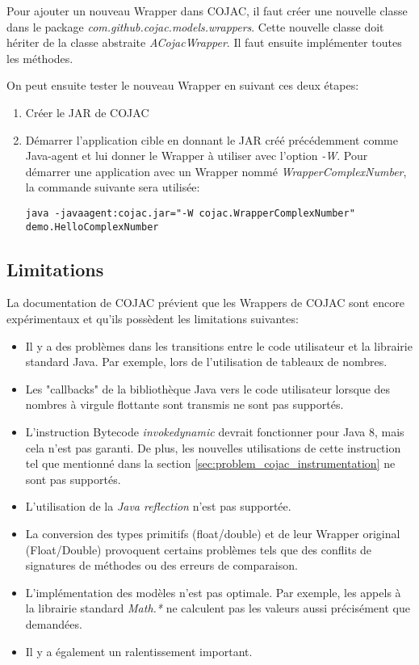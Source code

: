 Pour ajouter un nouveau \gls{Wrapper} dans \gls{COJAC}, il faut créer une nouvelle classe dans le package \textit{com.github.cojac.models.wrappers}. Cette nouvelle classe doit hériter de la classe abstraite \textit{ACojacWrapper}. Il faut ensuite implémenter toutes les méthodes.

On peut ensuite tester le nouveau \gls{Wrapper} en suivant ces deux étapes:

\begin{enumerate}
    \item Créer le \gls{JAR} de \gls{COJAC}
    \item Démarrer l'application cible en donnant le \gls{JAR} créé précédemment comme \gls{Java-agent} et lui donner le \gls{Wrapper} à utiliser avec l'option \textit{-W}. Pour démarrer une application avec un \gls{Wrapper} nommé \textit{WrapperComplexNumber}, la commande suivante sera utilisée:
    \begin{verbatim}
java -javaagent:cojac.jar="-W cojac.WrapperComplexNumber" demo.HelloComplexNumber
    \end{verbatim}
\end{enumerate}

\subsection{Limitations}

La documentation de COJAC \cite{cojac-wiki-limitations} prévient que les \glspl{Wrapper} de \gls{COJAC} sont encore expérimentaux et qu'ils possèdent les limitations suivantes:

\begin{itemize}
    \item Il y a des problèmes dans les transitions entre le code utilisateur et la librairie standard Java. Par exemple, lors de l'utilisation de tableaux de nombres.
    \item Les "callbacks" de la bibliothèque Java vers le code utilisateur lorsque des nombres à virgule flottante sont transmis ne sont pas supportés.
    \item L'instruction \gls{Bytecode} \textit{invokedynamic} devrait fonctionner pour Java 8, mais cela n'est pas garanti. De plus, les nouvelles utilisations de cette instruction tel que mentionné dans la section \ref{sec:problem_cojac_instrumentation} ne sont pas supportés.
    \item L'utilisation de la \textit{Java reflection} n'est pas supportée.
    \item La conversion des types primitifs (float/double) et de leur \gls{Wrapper} original (Float/\hspace{0pt}Double) provoquent certains problèmes tels que des conflits de signatures de méthodes ou des erreurs de comparaison.
    \item L'implémentation des modèles n'est pas optimale. Par exemple, les appels à la librairie standard \textit{Math.*} ne calculent pas les valeurs aussi précisément que demandées.
    \item Il y a également un ralentissement important.
\end{itemize}

